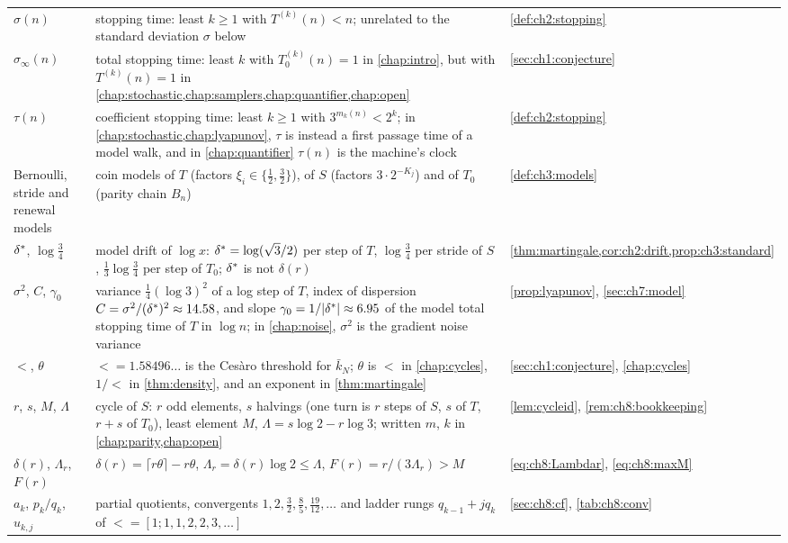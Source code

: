 \begin{longtable}{@{}>{\raggedright\arraybackslash}p{0.95in}>{\raggedright\arraybackslash}p{3.3in}>{\raggedright\arraybackslash}p{1.0in}@{}}
\addlinespace[4pt]
$\sigma(n)$ & stopping time: least $k\geq1$ with $T^{(k)}(n)<n$; unrelated to the standard deviation $\sigma$ below & \cref{def:ch2:stopping} \\
$\sigma_\infty(n)$ & total stopping time: least $k$ with $T_0^{(k)}(n)=1$ in \cref{chap:intro}, but with $T^{(k)}(n)=1$ in \cref{chap:stochastic,chap:samplers,chap:quantifier,chap:open} & \cref{sec:ch1:conjecture} \\
$\tau(n)$ & coefficient stopping time: least $k\geq1$ with $3^{m_k(n)}<2^k$; in \cref{chap:stochastic,chap:lyapunov}, $\tau$ is instead a first passage time of a model walk, and in \cref{chap:quantifier} $\tau(n)$ is the machine's clock & \cref{def:ch2:stopping} \\
\addlinespace[4pt]
Bernoulli, stride and renewal models & coin models of $T$ (factors $\xi_i\in\{\frac12,\frac32\}$), of $S$ (factors $3\cdot2^{-K_j}$) and of $T_0$ (parity chain $B_n$) & \cref{def:ch3:models} \\
$\delta^{*}$, $\log\frac34$ & model drift of $\log x$: $\delta^{*}=\log(\sqrt3/2)$ per step of $T$, $\log\frac34$ per stride of $S$, $\frac13\log\frac34$ per step of $T_0$; $\delta^{*}$ is not $\delta(r)$ & \cref{thm:martingale,cor:ch2:drift,prop:ch3:standard} \\
$\sigma^2$, $C$, $\gamma_0$ & variance $\frac14(\log3)^2$ of a log step of $T$, index of dispersion $C=\sigma^2/(\delta^{*})^2\approx14.58$, and slope $\gamma_0=1/|\delta^{*}|\approx6.95$ of the model total stopping time of $T$ in $\log n$; in \cref{chap:noise}, $\sigma^2$ is the gradient noise variance & \cref{prop:lyapunov}, \cref{sec:ch7:model} \\
\addlinespace[4pt]
$\lt$, $\theta$ & $\lt=1.58496\dots$ is the Ces\`aro threshold for $\bar k_N$; $\theta$ is $\lt$ in \cref{chap:cycles}, $1/\lt$ in \cref{thm:density}, and an exponent in \cref{thm:martingale} & \cref{sec:ch1:conjecture}, \cref{chap:cycles} \\
$r$, $s$, $M$, $\Lambda$ & cycle of $S$: $r$ odd elements, $s$ halvings (one turn is $r$ steps of $S$, $s$ of $T$, $r+s$ of $T_0$), least element $M$, $\Lambda=s\log2-r\log3$; written $m$, $k$ in \cref{chap:parity,chap:open} & \cref{lem:cycleid}, \cref{rem:ch8:bookkeeping} \\
$\delta(r)$, $\Lambda_r$, $F(r)$ & $\delta(r)=\lceil r\theta\rceil-r\theta$, $\Lambda_r=\delta(r)\log2\le\Lambda$, $F(r)=r/(3\Lambda_r)>M$ & \cref{eq:ch8:Lambdar}, \cref{eq:ch8:maxM} \\
$a_k$, $p_k/q_k$, $u_{k,j}$ & partial quotients, convergents $1,2,\frac32,\frac85,\frac{19}{12},\dots$ and ladder rungs $q_{k-1}+jq_k$ of $\lt=[1;1,1,2,2,3,\dots]$ & \cref{sec:ch8:cf}, \cref{tab:ch8:conv} \\

\end{longtable}
